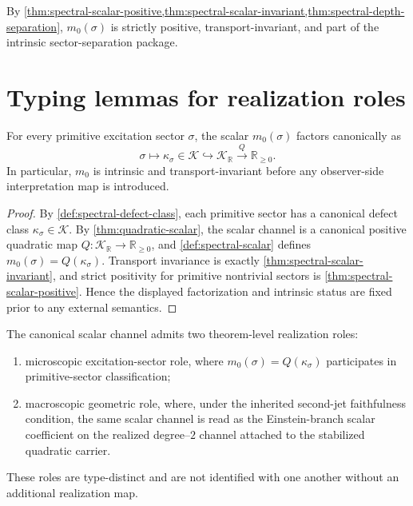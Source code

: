 \begin{remark}
By \cref{thm:spectral-scalar-positive,thm:spectral-scalar-invariant,thm:spectral-depth-separation},
\(m_0(\sigma)\) is strictly positive, transport-invariant, and part of the
intrinsic sector-separation package.
\end{remark}

\section{Typing lemmas for realization roles}
\label{sec:matter-realization-typing}

\begin{lemma}
\label{lem:matter-realization-factorization}
For every primitive excitation sector \(\sigma\), the scalar
\(m_0(\sigma)\) factors canonically as
\[
  \sigma
  \longmapsto
  \kappa_\sigma\in\mathcal K
  \hookrightarrow
  \mathcal K_{\mathbb R}
  \xrightarrow{\,Q\,}
  \mathbb R_{\ge0}.
\]
In particular, \(m_0\) is intrinsic and transport-invariant before any
observer-side interpretation map is introduced.
\end{lemma}

\begin{proof}
By \cref{def:spectral-defect-class}, each primitive sector has a canonical
defect class \(\kappa_\sigma\in\mathcal K\).
By \cref{thm:quadratic-scalar}, the scalar channel is a canonical positive
quadratic map
\(Q:\mathcal K_{\mathbb R}\to\mathbb R_{\ge0}\), and
\cref{def:spectral-scalar} defines
\(m_0(\sigma)=Q(\kappa_\sigma)\).
Transport invariance is exactly
\cref{thm:spectral-scalar-invariant}, and strict positivity for primitive
nontrivial sectors is \cref{thm:spectral-scalar-positive}.
Hence the displayed factorization and intrinsic status are fixed prior to
any external semantics.
\end{proof}

\begin{proposition}
\label{prop:matter-realization-role-split}
The canonical scalar channel admits two theorem-level realization roles:
\begin{enumerate}[label=\textup{(\roman*)}]
\item
      microscopic excitation-sector role, where
      \(m_0(\sigma)=Q(\kappa_\sigma)\) participates in primitive-sector
      classification;
\item
      macroscopic geometric role, where, under the inherited second-jet faithfulness condition, the same scalar channel is read as the
      Einstein-branch scalar coefficient on the realized degree--\(2\)
      channel attached to the stabilized quadratic carrier.
\end{enumerate}
These roles are type-distinct and are not identified with one another
without an additional realization map.
\end{proposition}


